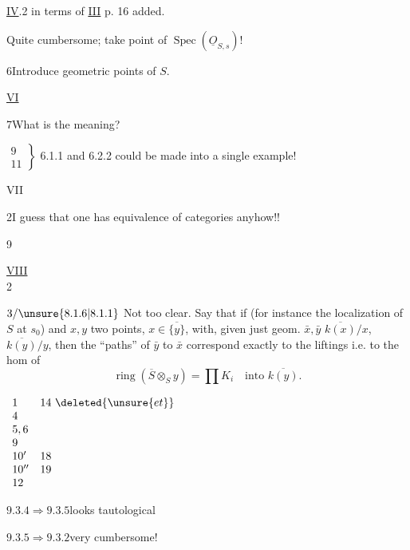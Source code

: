 \uline{IV}\quad {}.2  in terms of \uline{III} p. 16 added.

Quite  cumbersome; take point of
$\operatorname{Spec}(\underline O_{S,s})$!

6\quad Introduce geometric points of $S$.

\uline{VI}\quad{}

7\quad What is the meaning?

$\left.\begin{array}{l}9\\11\end{array}\right\}$
6.1.1 and 6.2.2 could be made into a single example!


VII

2\quad I guess that one has equivalence of categories anyhow!!


9

\uline{VIII}\\
\hspace*{3em}2

$3/\unsure{8.1.6|8.1.1}$ Not too clear. Say that if
(for instance the localization of $S$ at $s_0$)
and 
$x,y$ two points, $x\in\overline{\{y\}}$,
 with, given just geom. $\bar x,\bar y$
$\overline{k(x)}/x$, $\overline{k(y)}/y$, then the ``paths'' of $\bar y$ to $\bar x$
correspond exactly to the  liftings
i.e. to the hom of
\[
\operatorname{ring}(\overline S\otimes_S y)=\prod K_i
\quad\text{into }\overline{k(y)}.
\]

\quad
$\begin{array}{ll}
1&14\ \deleted{\unsure{et}}\\
4&\\
5,6&\\
9&\\
10'&18\\
10''&19\\
12&
\end{array}$

$9.3.4\Rightarrow9.3.5$\quad looks tautological

$9.3.5\Rightarrow9.3.2$\quad very cumbersome!

